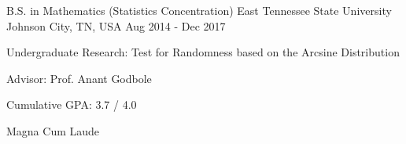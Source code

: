 

\begin{cventries}

  \cventry
    {B.S. in Mathematics (Statistics Concentration)} %
    {East Tennessee State University} %
    {Johnson City, TN, USA} %
    {Aug 2014 - Dec 2017} %
    {
    \begin{cvitems}
    \item Undergraduate Research: Test for Randomness based on the Arcsine Distribution
    \item Advisor: Prof. Anant Godbole
    \item Cumulative GPA: 3.7 / 4.0
    \item Magna Cum Laude
    \end{cvitems}
    }


\end{cventries}
